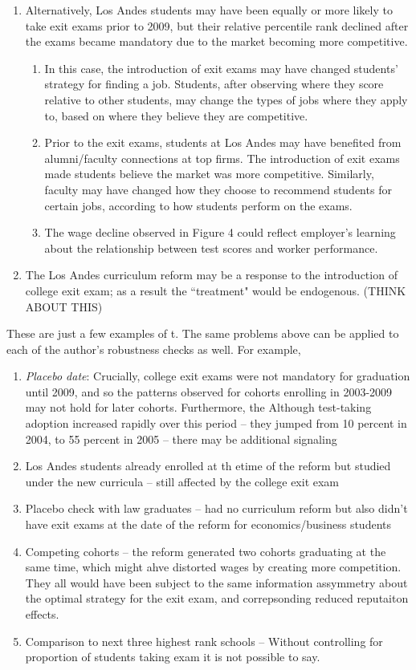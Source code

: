\documentclass[a4paper, 11pt]{article}
\begin{document}
\begin{enumerate}
\item Alternatively, Los Andes students may have been equally or more likely to take exit exams prior to 2009, but their relative percentile rank declined after the exams became mandatory due to the market becoming more competitive.  
\begin{enumerate}
\item In this case, the introduction of exit exams may have changed students' strategy for finding a job.   Students, after observing where they score relative to other students, may change the types of jobs where they apply to, based on where they believe they are competitive.  
\item Prior to the exit exams, students at Los Andes may have benefited from alumni/faculty connections at top firms.  The introduction of exit exams made students believe the market was more competitive.  Similarly, faculty may have changed how they choose to recommend students for certain jobs, according to how students perform on the exams. 
\item The wage decline observed in Figure 4 could reflect employer's learning about the relationship between test scores and worker performance. 
\end{enumerate}
\item 
The Los Andes curriculum reform may be a response to the introduction of college exit exam; as a result the ``treatment" would be endogenous.  (THINK ABOUT THIS) 
\end{enumerate}
These are just a few examples of t. The same problems above can be applied to each of the author's robustness checks as well.   For example, 

\begin{enumerate}

\item \textit{Placebo date}: Crucially, college exit exams were not mandatory for graduation until 2009, and so the patterns observed for cohorts enrolling in 2003-2009 may not hold for later cohorts.  Furthermore, the Although test-taking adoption increased rapidly over this period -- they jumped from 10 percent in 2004, to 55 percent in 2005 -- there may be additional signaling 

\item Los Andes students already enrolled at th etime of the reform but studied under the new curricula -- still affected by the college exit exam
\item Placebo check with law graduates -- had no curriculum reform but also didn't have exit exams at the date of the reform for economics/business students
\item Competing cohorts -- the reform generated two cohorts graduating at the same time, which might ahve distorted wages by creating more competition.  They all would have been subject to the same information assymmetry about the optimal strategy for the exit exam, and correpsonding reduced reputaiton effects.
\item Comparison to next three highest rank schools -- Without controlling for proportion of students taking exam it is not possible to say. 

\end{enumerate}
\end{document}
